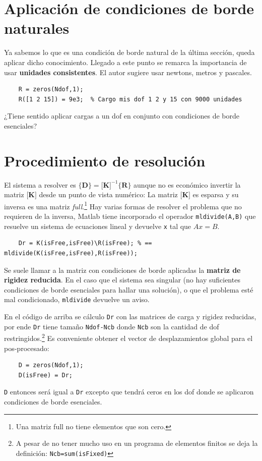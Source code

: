\documentclass[11pt, a4paper,titlepage]{article}
\newcommand{\rmfont}[1]{{\fontfamily{ptm}\selectfont%
#1}}
\newcommand{\Matlab}{\rmfont{\sc Matlab}}
\newcommand{\Mme}[1]{\boldsymbol{[}\mathbf{#1} \boldsymbol{]}}
\newcommand{\Cme}[1]{\boldsymbol{\{ }\mathbf{#1} \boldsymbol{\}} }
\newcommand{\CD}{\Cme{D}}
\newcommand{\MK}{\Mme{K}}
\newcommand{\CR}{\Cme{R}}
\begin{document}
\section{Aplicación de condiciones de borde naturales}
Ya sabemos lo que es una condición de borde natural de la última sección, queda aplicar dicho conocimiento. Llegado a este punto se remarca la importancia de usar \textbf{unidades consistentes}. El autor sugiere usar newtons, metros y pascales.  

\begin{verbatim}
    R = zeros(Ndof,1);
    R([1 2 15]) = 9e3;  % Cargo mis dof 1 2 y 15 con 9000 unidades
\end{verbatim}

¿Tiene sentido aplicar cargas a un dof en conjunto con condiciones de borde esenciales?

\section{Procedimiento de resolución}
El sistema a resolver es $\CD=\MK^{-1}\CR$ aunque no es económico invertir la matriz $\MK$ desde un punto de vista numérico: La matriz $\MK$ es esparsa y su inversa es una matriz \textit{full}.\footnote{Una matriz full no tiene elementos que son cero.} Hay varias formas de resolver el problema que no requieren de la inversa, \Matlab{} tiene incorporado el operador \texttt{mldivide(A,B)} que resuelve un sistema de ecuaciones lineal y devuelve \texttt{x} tal que $Ax=B$. 

\begin{verbatim}
    Dr = K(isFree,isFree)\R(isFree); % == mldivide(K(isFree,isFree),R(isFree));
\end{verbatim}
Se suele llamar a la matriz con condiciones de borde aplicadas la \textbf{matriz de rigidez reducida}. En el caso que el sistema sea singular (no hay suficientes condiciones de borde esenciales para hallar una solución), o que el problema esté mal condicionado, \texttt{mldivide} devuelve un aviso.  

En el código de arriba se cálculo \texttt{Dr} con las matrices de carga y rigidez reducidas, por ende \texttt{Dr} tiene tamaño \texttt{Ndof-Ncb} donde \texttt{Ncb} son la cantidad de dof restringidos.\footnote{A pesar de no tener mucho uso en un programa de elementos finitos se deja la definición: \texttt{Ncb=sum(isFixed)}} Es conveniente obtener el vector de desplazamientos global para el pos-procesado:

\begin{verbatim}
    D = zeros(Ndof,1);
    D(isFree) = Dr;
\end{verbatim}
\texttt{D} entonces será igual a \texttt{Dr} excepto que tendrá ceros en los dof donde se aplicaron condiciones de borde esenciales.
\end{document}
